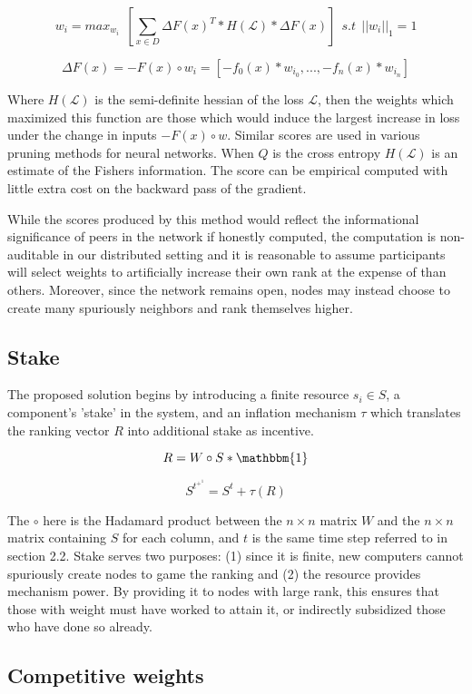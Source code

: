 \documentclass{article}
\begin{document}
\[ w_i = max_w_i \ \ [ \sum_{x \in D} \Delta F(x)^T * H (\mathcal{L}) * \Delta F(x) ] \ \ s.t \ \  ||w_i||_1 = 1 \]

\bigskip

\[ \Delta F (x) = -F(x) \circ w_i = [-f_0(x) * w_i_0, ..., -f_n(x) * w_i_n] \]


Where $H(\mathcal{L})$ is the semi-definite hessian of the loss $\mathcal{L}$, then the weights which maximized this function are those which would induce the largest increase in loss under the change in inputs $-F(x) \circ w$. Similar scores are used in various pruning methods for neural networks. When $Q$ is the cross entropy $H(\mathcal{L})$ is an estimate of the Fishers information. The score can be empirical computed with little extra cost on the backward pass of the gradient.
\bigskip

While the scores produced by this method would reflect the informational significance of peers in the network if honestly computed, the computation is non-auditable in our distributed setting and it is reasonable to assume participants will select weights to artificially increase their own rank at the expense of than others. Moreover, since the network remains open, nodes may instead choose to create many spuriously neighbors and rank themselves higher. 
\bigskip


\subsection{Stake}

The proposed solution begins by introducing a finite resource $s_i \in S$, a component's 'stake' in the system, and an inflation mechanism $\tau$ which translates the ranking vector $R$ into additional stake as incentive. 
\bigskip

\[ R = W \circ S * \mathbbm{1} \] 

\[ S^t^+^1 = S^t + \tau (R) \] 

The $\circ$ here is the Hadamard product between the $n \times n$ matrix $W$ and the $n \times n$ matrix containing $S$ for each column, and $t$ is the same time step referred to in section 2.2. Stake serves two purposes: (1) since it is finite, new computers cannot spuriously create nodes to game the ranking and (2) the resource provides mechanism power. By providing it to nodes with large rank, this ensures that those with weight must have worked to attain it, or indirectly subsidized those who have done so already.

\subsection{Competitive weights}
\end{document}
